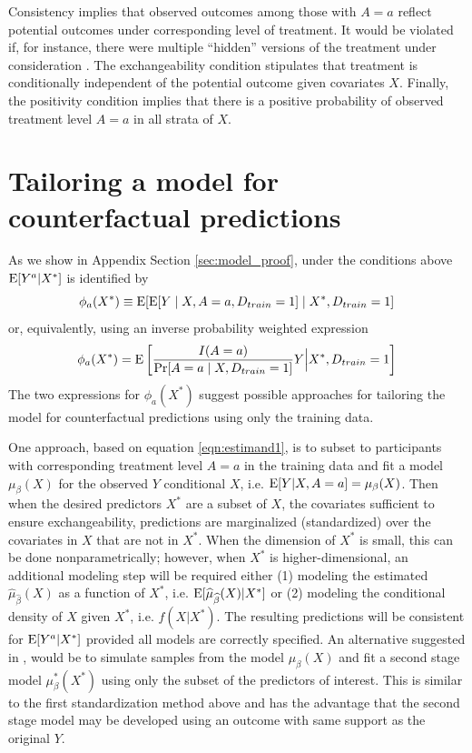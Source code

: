 Consistency implies that observed outcomes among those with $A = a$ reflect potential outcomes under corresponding level of treatment. It would be violated if, for instance, there were multiple ``hidden'' versions of the treatment under consideration \cite{rubin_randomization_1980}. The exchangeability condition stipulates that treatment is conditionally independent of the potential outcome given covariates $X$. Finally, the positivity condition implies that there is a positive probability of observed treatment level $A = a$ in all strata of $X$.  

\section{Tailoring a model for counterfactual predictions} \label{sec:model}

As we show in Appendix Section \ref{sec:model_proof}, under the conditions above $\operatorname{E}[Y^a | X^*]$ is identified by
\begin{equation}\label{eqn:estimand1}
    \phi_a(X^*) \equiv \operatorname{E}[\operatorname{E}[Y \mid X, A = a, D_{train} = 1] \mid X^*, D_{train} = 1]
\end{equation}
or, equivalently, using an inverse probability weighted expression 
\begin{equation}\label{eqn:estimand2}
    \phi_a(X^*) = \operatorname{E}\left[\frac{I(A = a)}{\Pr[A = a \mid X, D_{train} = 1]} Y \Big| X^*, D_{train} = 1\right]
\end{equation}
The two expressions for $\phi_a(X^*)$ suggest possible approaches for tailoring the model for counterfactual predictions using only the training data. 

One approach, based on equation \ref{eqn:estimand1}, is to subset to participants with corresponding treatment level $A = a$ in the training data and fit a model $\mu_\beta(X)$ for the observed $Y$ conditional $X$, i.e. $\operatorname{E}[Y | X, A = a] = \mu_\beta(X)$. Then when the desired predictors $X^*$ are a subset of $X$, the covariates sufficient to ensure exchangeability,  predictions are marginalized (standardized) over the covariates in $X$ that are not in $X^*$. When the dimension of $X^*$ is small, this can be done nonparametrically; however, when $X^*$ is higher-dimensional, an additional modeling step will be required either (1) modeling the estimated $\widehat{\mu}_{\widehat{\beta}}(X)$ as a function of $X^*$, i.e. $\operatorname{E}[\widehat{\mu}_{\widehat{\beta}}(X) | X^*]$ or (2) modeling the conditional density of $X$ given $X^*$, i.e. $f(X | X^*)$.  The resulting predictions will be consistent for $\operatorname{E}[Y^a | X^*]$ provided all models are correctly specified. An alternative suggested in \cite{dickerman_predicting_2022}, would be to simulate samples from the model $\mu_\beta(X)$ and fit a second stage model $\mu^*_\beta(X^*)$ using only the subset of the predictors of interest. This is similar to the first standardization method above and has the advantage that the second stage model may be developed using an outcome with same support as the original $Y$.

